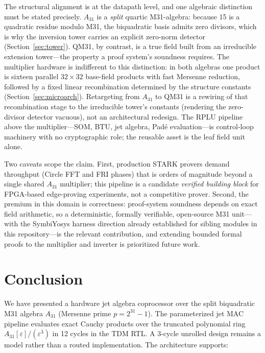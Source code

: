 \documentclass[conference]{IEEEtran}
\begin{document}
The structural alignment is at the datapath level, and one algebraic
distinction must be stated precisely. $A_{31}$ is a \emph{split} quartic
M31-algebra: because 15 is a quadratic residue modulo M31, the biquadratic
basis admits zero divisors, which is why the inversion tower carries an
explicit zero-norm detector (Section~\ref{sec:tower}). QM31, by contrast,
is a true field built from an irreducible extension tower---the property a
proof system's soundness requires. The multiplier hardware is indifferent
to this distinction: in both algebras one product is sixteen parallel
$32\times32$ base-field products with fast Mersenne reduction, followed by
a fixed linear recombination determined by the structure constants
(Section~\ref{sec:microarch}). Retargeting from $A_{31}$ to QM31 is a
rewiring of that recombination stage to the irreducible tower's constants
(rendering the zero-divisor detector vacuous), not an architectural
redesign. The RPLU pipeline above the multiplier---SOM, BTU, jet algebra,
Pad\'e evaluation---is control-loop machinery with no cryptographic role;
the reusable asset is the leaf field unit alone.

Two caveats scope the claim. First, production STARK provers demand
throughput (Circle FFT and FRI phases) that is orders of magnitude beyond a
single shared $A_{31}$ multiplier; this pipeline is a candidate \emph{verified building
block} for FPGA-based edge-proving experiments, not a competitive prover.
Second, the premium in this domain is correctness: proof-system soundness
depends on exact field arithmetic, so a deterministic, formally verifiable,
open-source M31 unit---with the SymbiYosys harness direction already
established for sibling modules in this repository---is the relevant
contribution, and extending bounded formal proofs to the multiplier and
inverter is prioritized future work.


\section{Conclusion}
\label{sec:conclusion}

We have presented a hardware jet algebra coprocessor over the split
biquadratic M31 algebra $A_{31}$ (Mersenne prime $p = 2^{31}-1$). The
parameterized jet MAC pipeline evaluates exact Cauchy products over the
truncated polynomial ring $A_{31}[\varepsilon]/(\varepsilon^3)$
in 12 cycles in the TDM RTL. A 3-cycle unrolled design remains a model rather
than a routed implementation. The architecture supports:
\end{document}
